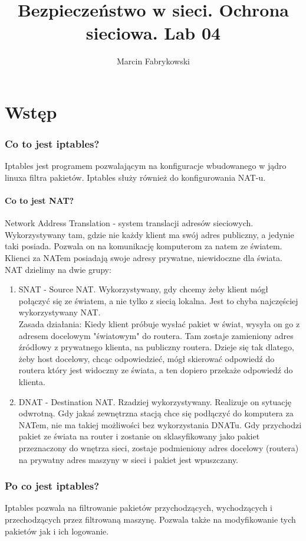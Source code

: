 \documentclass[a4paper,11pt]{article}
\author{Marcin Fabrykowski}
\title{Bezpieczeństwo w sieci. Ochrona sieciowa. Lab 04}
\begin{document}
\maketitle
\newpage
\part{Wstęp}
\section{Co to jest iptables?}
Iptables jest programem pozwalającym na konfiguracje wbudowanego w jądro linuxa filtra pakietów. Iptables służy również do konfigurowania NAT-u.
\subsection{Co to jest NAT?}
Network Address Translation - system translacji adresów sieciowych. Wykorzystywany tam, gdzie nie każdy klient ma swój adres publiczny, a jedynie taki posiada. Pozwala on na komunikację komputerom za natem ze światem. Klienci za NATem posiadają swoje adresy prywatne, niewidoczne dla świata.\\
NAT dzielimy na dwie grupy:
\begin{enumerate}
\item SNAT - Source NAT. Wykorzystywany, gdy chcemy żeby klient mógł połączyć się ze światem, a nie tylko z siecią lokalna. Jest to chyba najczęściej wykorzystywany NAT.\\
Zasada działania: Kiedy klient próbuje wysłać pakiet w świat, wysyła on go z adresem docelowym "światowym" do routera. Tam zostaje zamieniony adres źródłowy z prywatnego klienta, na publiczny routera.
Dzieje się tak dlatego, żeby host docelowy, chcąc odpowiedzieć, mógł skierować odpowiedź do routera który jest widoczny ze świata, a ten dopiero przekaże odpowiedź do klienta. 
\item DNAT - Destination NAT. Rzadziej wykorzystywany. Realizuje on sytuację odwrotną. Gdy jakaś zewnętrzna stacją chce się podłączyć do komputera za NATem, nie ma takiej możliwości bez wykorzystania DNATu. Gdy przychodzi pakiet ze świata na router i zostanie on sklasyfikowany jako pakiet przeznaczony do wnętrza sieci, zostaje podmieniony adres docelowy (routera) na prywatny adres maszyny w sieci i pakiet jest wpuszczany.
\end{enumerate}
\section{Po co jest iptables?}
Iptables pozwala na filtrowanie pakietów przychodzących, wychodzących i przechodzących przez filtrowaną maszynę. Pozwala także na modyfikowanie tych pakietów jak i ich logowanie.
\end{document}
